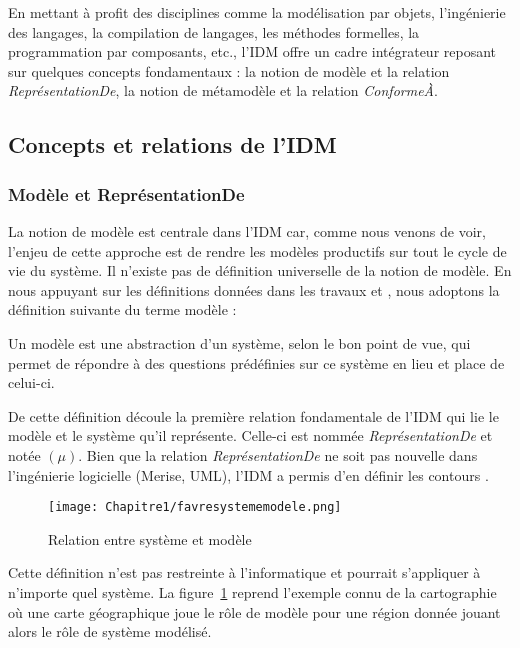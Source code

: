 En mettant à profit des disciplines comme la modélisation par objets, l'ingénierie des langages, la compilation de langages, les méthodes formelles, la programmation par composants, etc., l'IDM offre un cadre intégrateur reposant sur quelques concepts fondamentaux : la notion de modèle et la relation \textit{ReprésentationDe}, la notion de métamodèle et la relation \textit{ConformeÀ}.

\subsection{Concepts et relations de l'IDM}
\subsubsection{Modèle et ReprésentationDe}
La notion de modèle est centrale dans l'IDM car, comme nous venons de voir, l'enjeu de cette approche est de rendre les modèles productifs sur tout le cycle de vie du système. Il n'existe pas de définition universelle de la notion de modèle. En nous appuyant sur les définitions données dans les travaux \cite{minsky1967computation} \cite{bezivin2001towards} et \cite{seidewitz2003models}, nous adoptons la définition suivante du terme modèle :

\begin{theorem}
Un modèle est une abstraction d'un système, selon le bon point de vue, qui permet de répondre à des questions prédéfinies sur ce système en lieu et place de celui-ci.
\end{theorem}

De cette définition découle la première relation fondamentale de l'IDM qui lie le modèle et le système qu'il représente. Celle-ci est nommée \textit{ReprésentationDe} et notée $(\mu)$. Bien que la relation \textit{ReprésentationDe} ne soit pas nouvelle dans l'ingénierie logicielle (Merise, UML), l'IDM a permis d'en définir les contours \cite{atkinson2003model} \cite{seidewitz2003models} \cite{bezivin2004search}.

\begin{figure}[!htbp]
 \begin{center}
  \texttt{[image: Chapitre1/favresystememodele.png]}
 \end{center}
 \caption{Relation entre système et modèle \protect\cite{favre2006ingenierie}}
 \label{fig:systemModele}
\end{figure}

Cette définition n'est pas restreinte à l'informatique et pourrait s'appliquer à n'importe quel système. 
La figure~\ref{fig:systemModele} reprend l'exemple connu de la cartographie où une carte géographique joue le rôle de modèle pour une région donnée jouant alors le rôle de système modélisé. 

